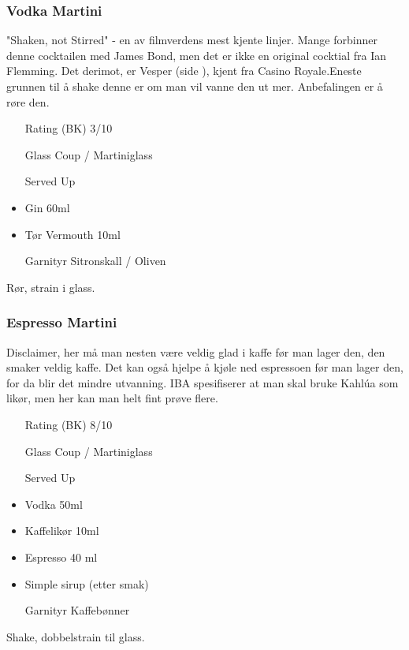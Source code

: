 \subsubsection{Vodka Martini}
\label{drink:v_martini}
"Shaken, not Stirred" - en av filmverdens mest kjente linjer. Mange forbinner denne cocktailen med James Bond, men det er ikke en original cocktial fra Ian Flemming. Det derimot, er Vesper (side \pageref{drink:vesper}), kjent fra Casino Royale.Eneste grunnen til å shake denne er om man vil vanne den ut mer. Anbefalingen er å røre den.
\begin{itemize}
    \item[Rating (BK)] 3/10
    \item[Glass] Coup / Martiniglass
    \item[Served] Up
    \item Gin 60ml
    \item Tør Vermouth 10ml
    \item[Garnityr] Sitronskall / Oliven
\end{itemize}
Rør, strain i glass.

\subsubsection{Espresso Martini}
Disclaimer, her må man nesten være veldig glad i kaffe før man lager den, den smaker veldig kaffe. Det kan også hjelpe å kjøle ned espressoen før man lager den, for da blir det mindre utvanning. IBA spesifiserer at man skal bruke Kahlúa som likør, men her kan man helt fint prøve flere.
\begin{itemize}
    \item[Rating (BK)] 8/10
    \item[Glass] Coup / Martiniglass
    \item[Served] Up
    \item Vodka 50ml
    \item Kaffelikør 10ml
    \item Espresso 40 ml
    \item Simple sirup (etter smak)
    \item[Garnityr] Kaffebønner
\end{itemize}
Shake, dobbelstrain til glass.

